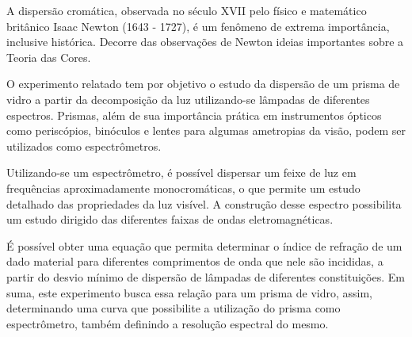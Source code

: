 A dispersão cromática, observada no século XVII pelo físico e matemático britânico Isaac Newton (1643 - 1727), é um fenômeno de extrema importância, inclusive histórica. Decorre das observações de Newton ideias importantes sobre a Teoria das Cores.

O experimento relatado tem por objetivo o estudo da dispersão de um prisma de vidro a partir da decomposição da luz utilizando-se lâmpadas de diferentes espectros. Prismas, além de sua importância prática em instrumentos ópticos como periscópios, binóculos e lentes para algumas ametropias da visão, podem ser utilizados como espectrômetros.

Utilizando-se um espectrômetro, é possível dispersar um feixe de luz em frequências aproximadamente monocromáticas, o que permite um estudo detalhado das propriedades da luz visível. A construção desse espectro possibilita um estudo dirigido das diferentes faixas de ondas eletromagnéticas.

É possível obter uma equação que permita determinar o índice de refração de um dado material para diferentes comprimentos de onda que nele são incididas, a partir do desvio mínimo de dispersão de lâmpadas de diferentes constituições. Em suma, este experimento busca essa relação para um prisma de vidro, assim, determinando uma curva que possibilite a utilização do prisma como espectrômetro, também definindo a resolução espectral do mesmo.
